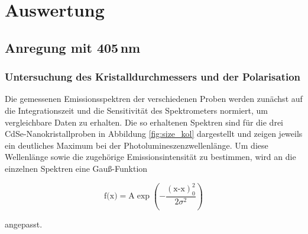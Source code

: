 \newpage
\section{Auswertung}

\subsection{Anregung mit 405\,nm}
    \subsubsection*{Untersuchung des Kristalldurchmessers und der Polarisation}
        Die gemessenen Emissionsspektren der verschiedenen Proben werden zunächst auf die Integrationszeit und die Sensitivität des Spektrometers normiert, um vergleichbare Daten zu erhalten. Die so erhaltenen 
        Spektren sind für die drei CdSe-Nanokristallproben in Abbildung \ref{fig:size_kol} dargestellt und zeigen jeweils ein deutliches Maximum bei der Photolumineszenzwellenlänge. Um diese Wellenlänge sowie 
        die zugehörige Emissionsintensität zu bestimmen, wird an die einzelnen Spektren eine Gauß-Funktion

        \begin{equation*}
            \text{f(x)} = \text{A} \exp\left(- \frac{\left(\text{x-x}\right)_0^2}{2\sigma^2}\right)
        \end{equation*}

        angepasst.

        \FloatBarrier

